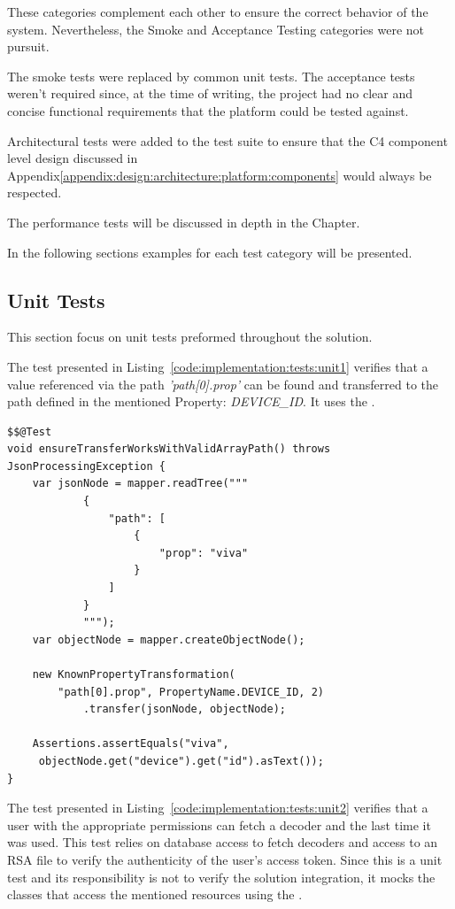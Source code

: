 These categories complement each other to ensure the correct behavior of the system. Nevertheless, the Smoke and Acceptance Testing categories were not pursuit.

The smoke tests were replaced by common unit tests. The acceptance tests weren't required since, at the time of writing, the project had no clear and concise functional requirements that the platform could be tested against.

Architectural tests were added to the test suite to ensure that the C4 component level design discussed in Appendix\ref{appendix:design:architecture:platform:components} would always be respected.

The performance tests will be discussed in depth in the  Chapter.

In the following sections examples for each test category will be presented.

\subsection{Unit Tests}
\label{subsec:implementation:tests:unit}

This section focus on unit tests preformed throughout the solution.

The test presented in Listing~\ref{code:implementation:tests:unit1} verifies that a value referenced via the path \textit{'path[0].prop'} can be found and transferred to the path defined in the mentioned Property: \textit{DEVICE\_ID}.
It uses the .

\begin{lstlisting}[style=Java, caption=Unit Test Example in \textit{iot-core} package, label={code:implementation:tests:unit1}]
$$@Test
void ensureTransferWorksWithValidArrayPath() throws JsonProcessingException {
    var jsonNode = mapper.readTree("""
            {
                "path": [
                    {
                        "prop": "viva"
                    }
                ]
            }
            """);
    var objectNode = mapper.createObjectNode();

    new KnownPropertyTransformation(
        "path[0].prop", PropertyName.DEVICE_ID, 2)
            .transfer(jsonNode, objectNode);

    Assertions.assertEquals("viva",
     objectNode.get("device").get("id").asText());
}
\end{lstlisting}

The test presented in Listing~\ref{code:implementation:tests:unit2} verifies that a user with the appropriate permissions can fetch a decoder and the last time it was used. This test relies on database access to fetch decoders and access to an RSA file to verify the authenticity of the user's access token. Since this is a unit test and its responsibility is not to verify the solution integration, it mocks the classes that access the mentioned resources using the .

